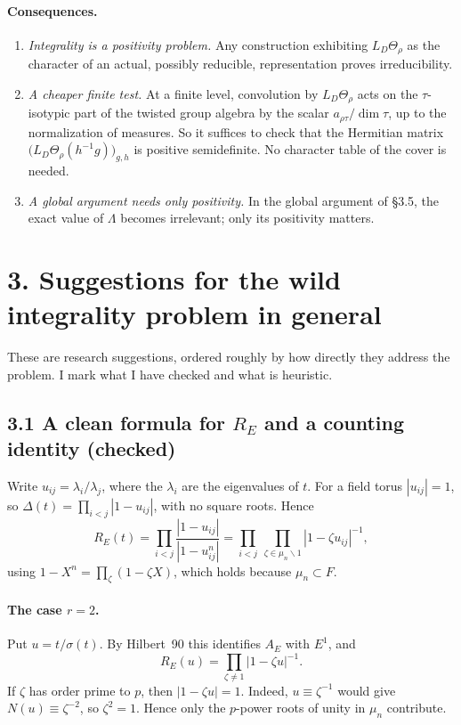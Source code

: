 \documentclass[11pt]{article}
\theoremstyle{plain}
\begin{document}
\paragraph{Consequences.}
\begin{enumerate}[label=(\roman*)]
\item \emph{Integrality is a positivity problem.} Any construction
exhibiting $L_D\Theta_\rho$ as the character of an actual, possibly
reducible, representation proves irreducibility.
\item \emph{A cheaper finite test.} At a finite level, convolution by
$L_D\Theta_\rho$ acts on the $\tau$-isotypic part of the twisted group
algebra by the scalar $a_{\rho\tau}/\dim\tau$, up to the normalization
of measures. So it suffices to check that the Hermitian matrix
$\bigl(L_D\Theta_\rho(h^{-1}g)\bigr)_{g,h}$ is positive semidefinite.
No character table of the cover is needed.
\item \emph{A global argument needs only positivity.} In the global
argument of \S3.5, the exact value of $\Lambda$ becomes irrelevant; only
its positivity matters.
\end{enumerate}

\section*{3. Suggestions for the wild integrality problem in general}
These are research suggestions, ordered roughly by how directly they
address the problem. I mark what I have checked and what is heuristic.

\subsection*{3.1 A clean formula for $R_E$ and a counting identity (checked)}
Write $u_{ij}=\lambda_i/\lambda_j$, where the $\lambda_i$ are the
eigenvalues of $t$. For a field torus $|u_{ij}|=1$, so
$\Delta(t)=\prod_{i<j}|1-u_{ij}|$, with no square roots. Hence
\[
R_E(t)=\prod_{i<j}\frac{|1-u_{ij}|}{|1-u_{ij}^n|}
=\prod_{i<j}\ \prod_{\zeta\in\mu_n\smallsetminus1}|1-\zeta u_{ij}|^{-1},
\]
using $1-X^n=\prod_{\zeta}(1-\zeta X)$, which holds because
$\mu_n\subset F$.

\paragraph{The case $r=2$.} Put $u=t/\sigma(t)$. By Hilbert~90 this
identifies $A_E$ with $E^1$, and
\[
R_E(u)=\prod_{\zeta\ne1}|1-\zeta u|^{-1}.
\]
If $\zeta$ has order prime to $p$, then $|1-\zeta u|=1$. Indeed,
$u\equiv\zeta^{-1}$ would give $N(u)\equiv\zeta^{-2}$, so $\zeta^2=1$.
Hence only the $p$-power roots of unity in $\mu_n$ contribute.
\end{document}
